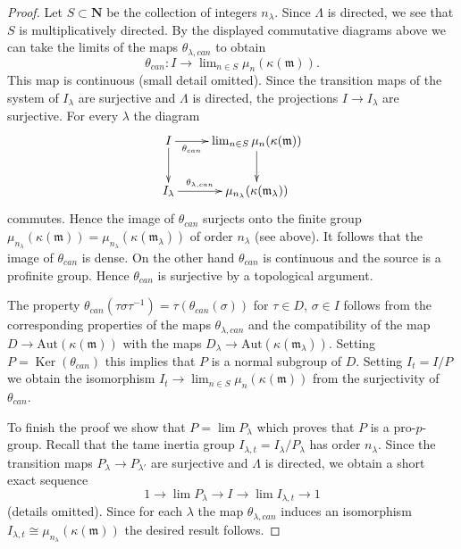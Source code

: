 \documentclass{stacks-project}
\theoremstyle{plain}
\theoremstyle{definition}
\theoremstyle{remark}
\numberwithin{equation}{subsection}
\def\lim{\mathop{\mathrm{lim}}\nolimits}
\def\Ker{\mathop{\mathrm{Ker}}}
\begin{document}
\begin{proof}
\medskip\noindent
Let $S \subset \mathbf{N}$ be the collection of integers $n_\lambda$.
Since $\Lambda$ is directed, we see that $S$ is multiplicatively directed.
By the displayed commutative diagrams above we can take the limits of
the maps $\theta_{\lambda, can}$ to obtain
$$
\theta_{can} : I \to \lim_{n \in S} \mu_n(\kappa(\mathfrak m)).
$$
This map is continuous (small detail omitted). Since the transition maps
of the system of $I_\lambda$ are surjective
and $\Lambda$ is directed, the projections $I \to I_\lambda$
are surjective. For every $\lambda$ the diagram
$$
\xymatrix{
I \ar[d] \ar[r]_-{\theta_{can}} &
\lim_{n \in S} \mu_n(\kappa(\mathfrak m)) \ar[d] \\
I_{\lambda} \ar[r]^-{\theta_{\lambda, can}} &
\mu_{n_\lambda}(\kappa(\mathfrak m_\lambda))
}
$$
commutes. Hence the image of $\theta_{can}$ surjects onto the finite group
$\mu_{n_\lambda}(\kappa(\mathfrak m)) =
\mu_{n_\lambda}(\kappa(\mathfrak m_\lambda))$ of order $n_\lambda$
(see above). It follows that the image of $\theta_{can}$ is dense.
On the other hand $\theta_{can}$ is continuous and the
source is a profinite group. Hence $\theta_{can}$ is surjective
by a topological argument.

\medskip\noindent
The property $\theta_{can}(\tau \sigma \tau^{-1}) = \tau(\theta_{can}(\sigma))$
for $\tau \in D$, $\sigma \in I$ follows from the corresponding properties
of the maps $\theta_{\lambda, can}$ and the compatibility of the map
$D \to \text{Aut}(\kappa(\mathfrak m))$ with the maps
$D_\lambda \to \text{Aut}(\kappa(\mathfrak m_\lambda))$.
Setting $P = \Ker(\theta_{can})$ this implies
that $P$ is a normal subgroup of $D$. Setting $I_t = I/P$
we obtain the isomorphism $I_t \to \lim_{n \in S} \mu_n(\kappa(\mathfrak m))$
from the surjectivity of $\theta_{can}$.

\medskip\noindent
To finish the proof we show that $P = \lim P_\lambda$ which proves
that $P$ is a pro-$p$-group. Recall that the tame inertia group
$I_{\lambda, t} = I_\lambda/P_\lambda$ has order $n_\lambda$.
Since the transition maps $P_\lambda \to P_{\lambda'}$ are surjective
and $\Lambda$ is directed, we obtain a short exact sequence
$$
1 \to \lim P_\lambda \to I \to \lim I_{\lambda, t} \to 1
$$
(details omitted). Since for each $\lambda$ the map $\theta_{\lambda, can}$
induces an isomorphism
$I_{\lambda, t} \cong \mu_{n_\lambda}(\kappa(\mathfrak m))$
the desired result follows.
\end{proof}
\end{document}
